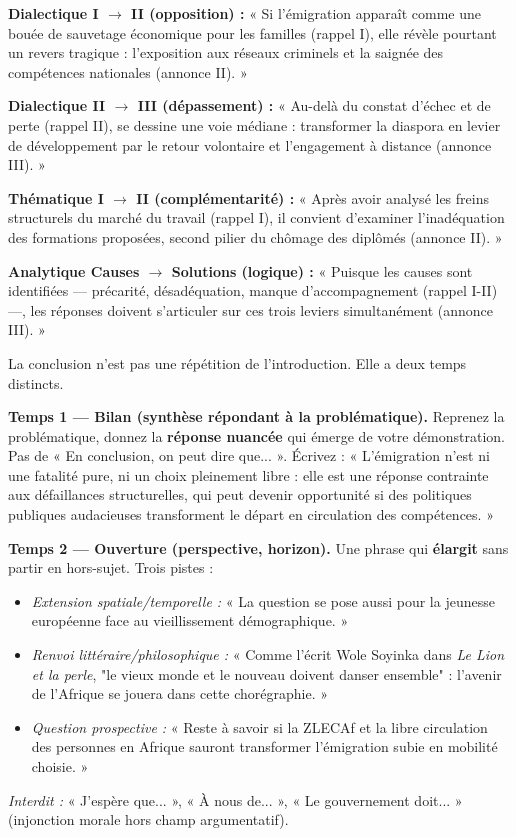 \documentclass[11pt]{article}
\newcounter{popsec}
\newcounter{popsub}
\newcommand{\courssub}[1]{%
  \stepcounter{popsub}%
  \par\vspace{9pt}\noindent{\popxbold\fontsize{11.5}{13}\selectfont\color{popink}{\color{poporange}\thepopsec.\thepopsub}\hspace{6pt}#1}\par\nopagebreak\vspace{4pt}
}
\begin{document}
\begin{exemplebox}
\textbf{Dialectique I $\to$ II (opposition) :} « Si l'émigration apparaît comme une bouée de sauvetage économique pour les familles (rappel I), elle révèle pourtant un revers tragique : l'exposition aux réseaux criminels et la saignée des compétences nationales (annonce II). »

\textbf{Dialectique II $\to$ III (dépassement) :} « Au-delà du constat d'échec et de perte (rappel II), se dessine une voie médiane : transformer la diaspora en levier de développement par le retour volontaire et l'engagement à distance (annonce III). »

\textbf{Thématique I $\to$ II (complémentarité) :} « Après avoir analysé les freins structurels du marché du travail (rappel I), il convient d'examiner l'inadéquation des formations proposées, second pilier du chômage des diplômés (annonce II). »

\textbf{Analytique Causes $\to$ Solutions (logique) :} « Puisque les causes sont identifiées — précarité, désadéquation, manque d'accompagnement (rappel I-II) —, les réponses doivent s'articuler sur ces trois leviers simultanément (annonce III). »
\end{exemplebox}

\courssub{La conclusion : bilan et ouverture maîtrisée}

La conclusion n'est pas une répétition de l'introduction. Elle a deux temps distincts.

\begin{methode}
\textbf{Temps 1 — Bilan (synthèse répondant à la problématique).} Reprenez la problématique, donnez la \textbf{réponse nuancée} qui émerge de votre démonstration. Pas de « En conclusion, on peut dire que... ». Écrivez : « L'émigration n'est ni une fatalité pure, ni un choix pleinement libre : elle est une réponse contrainte aux défaillances structurelles, qui peut devenir opportunité si des politiques publiques audacieuses transforment le départ en circulation des compétences. »

\textbf{Temps 2 — Ouverture (perspective, horizon).} Une phrase qui \textbf{élargit} sans partir en hors-sujet. Trois pistes :
\begin{itemize}
\item \emph{Extension spatiale/temporelle :} « La question se pose aussi pour la jeunesse européenne face au vieillissement démographique. »
\item \emph{Renvoi littéraire/philosophique :} « Comme l'écrit Wole Soyinka dans \emph{Le Lion et la perle}, "le vieux monde et le nouveau doivent danser ensemble" : l'avenir de l'Afrique se jouera dans cette chorégraphie. »
\item \emph{Question prospective :} « Reste à savoir si la ZLECAf et la libre circulation des personnes en Afrique sauront transformer l'émigration subie en mobilité choisie. »
\end{itemize}
\emph{Interdit :} « J'espère que... », « À nous de... », « Le gouvernement doit... » (injonction morale hors champ argumentatif).
\end{methode}
\end{document}
